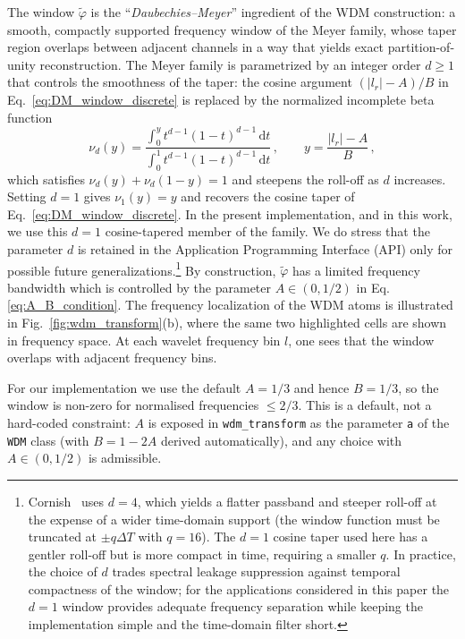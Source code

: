 The window $\tilde\varphi$ is the ``\emph{Daubechies--Meyer}''
ingredient of the WDM construction: a smooth, compactly supported
frequency window of the Meyer family, whose taper region overlaps
between adjacent channels in a way that yields exact partition-of-unity
reconstruction. The Meyer family is parametrized by an integer order
$d \geq 1$ that controls the smoothness of the taper: the cosine
argument $(|l_r|-A)/B$ in Eq.~\eqref{eq:DM_window_discrete} is replaced
by the normalized incomplete beta function
\begin{equation}\label{eq:nu_d_def}
  \nu_d(y) = \frac{\int_0^y t^{d-1}(1-t)^{d-1}\,\mathrm{d}t}
                  {\int_0^1 t^{d-1}(1-t)^{d-1}\,\mathrm{d}t}\,,
  \qquad y = \frac{|l_r|-A}{B}\,,
\end{equation}
which satisfies $\nu_d(y) + \nu_d(1-y) = 1$ and steepens the roll-off
as $d$ increases. Setting $d=1$ gives $\nu_1(y)=y$ and recovers the
cosine taper of Eq.~\eqref{eq:DM_window_discrete}. In the present
implementation, and in this work, we use this
$d=1$ cosine-tapered member of the family. We do stress that the parameter $d$ is retained in the Application Programming Interface (API) only for
possible future
generalizations.\footnote{Cornish~\cite{Cornish:2020odn} uses $d=4$,
  which yields a flatter passband and steeper roll-off at the expense
  of a wider time-domain support (the window function must be truncated
  at $\pm q\Delta T$ with $q=16$). The $d=1$ cosine taper used here has
  a gentler roll-off but is more compact in time, requiring a smaller
  $q$. In practice, the choice of $d$ trades spectral leakage
  suppression against temporal compactness of the window; for the
  applications considered in this paper the $d=1$ window provides
  adequate frequency separation while keeping the implementation simple
and the time-domain filter short.} By construction, $\tilde\varphi$ has a limited frequency bandwidth
which is controlled by the parameter $A\in(0,1/2)$ in Eq.\eqref{eq:A_B_condition}. 
The frequency localization of the WDM atoms is illustrated in Fig.~\ref{fig:wdm_transform}(b), where the same two highlighted cells are shown in frequency space.
At each wavelet frequency bin $l$, one sees that the window overlaps with adjacent frequency bins.  

For our implementation we use the default $A =1/3$ and
hence $B = 1/3$, so the window is non-zero for normalised frequencies
$\leq 2/3$. This is a default, not a hard-coded
constraint: $A$ is exposed in \texttt{wdm\_transform} as the
parameter \texttt{a} of the \texttt{WDM} class (with $B=1-2A$ derived
automatically), and any choice with $A\in(0,1/2)$ is admissible.%

